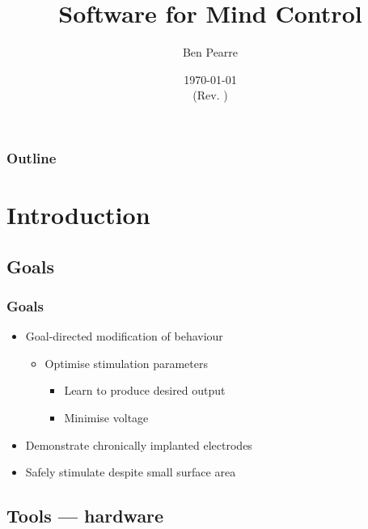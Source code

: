 \documentclass{beamer}
\title{Software for Mind Control}
\author{Ben Pearre}
\date{\today\\{\small (Rev. \svnrev)}}
\begin{document}
\begin{frame}
  \titlepage
\end{frame}

\begin{frame}
  \frametitle{Outline}
  \tableofcontents
\end{frame}




\section{Introduction}
\subsection{Goals}

\begin{frame}
  \frametitle{Goals}
  \begin{itemize}
  \item Goal-directed modification of behaviour
    \begin{itemize}
    \item Optimise stimulation parameters
      \begin{itemize}
      \item Learn to produce desired output
      \item Minimise voltage
      \end{itemize}
    \end{itemize}
  \item Demonstrate chronically implanted electrodes
  \item Safely stimulate despite small surface area
  \end{itemize}
\end{frame}


\subsection{Tools --- hardware}
\end{document}
